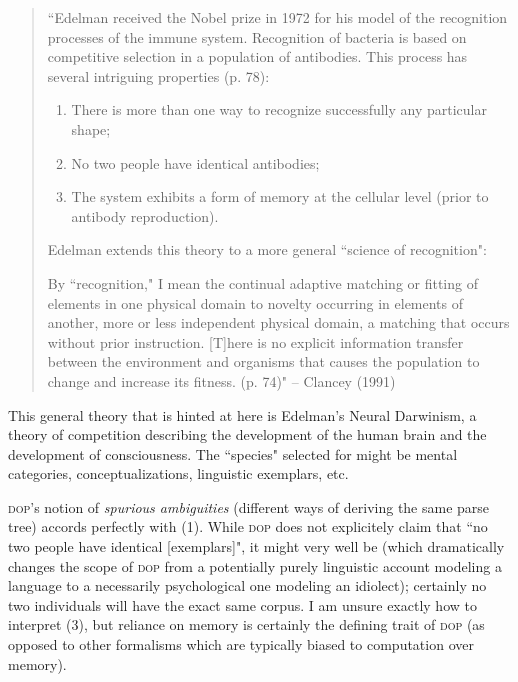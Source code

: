 \documentclass[10pt,a4paper]{article}
\begin{document}
\begin{quote}
	``Edelman received the Nobel prize in 1972 for his model of the
	recognition processes of the immune system. Recognition of bacteria is
	based on competitive selection in a population of antibodies. This
	process has several intriguing properties (p. 78): 
	
	\renewcommand{\theenumi}{(\arabic{enumi})}
	\renewcommand{\labelenumi}{\theenumi}

	\begin{enumerate} %

	\item There is more than one way to recognize successfully any particular shape;

	\item No two people have identical antibodies;

	\item The system exhibits a form of memory at the cellular level (prior to
	antibody reproduction).

	\end{enumerate}

	Edelman extends this theory to a more general ``science of recognition": 

	By ``recognition," I mean the continual adaptive matching or fitting of
	elements in one physical domain to novelty occurring in elements of
	another, more or less independent physical domain, a matching that
	occurs without prior instruction. [T]here is no explicit information
	transfer between the environment and organisms that causes the
	population to change and increase its fitness. (p. 74)" 
	-- Clancey (1991)
\end{quote}

This general theory that is hinted at here is Edelman's Neural Darwinism,
a theory of competition describing the development of the human brain and
the development of consciousness. The ``species" selected for might be mental
categories, conceptualizations, linguistic exemplars, etc. 

\textsc{dop}'s notion of {\em spurious ambiguities} (different ways of deriving the same
parse tree) accords perfectly with (1).  While \textsc{dop} does not explicitely claim
that ``no two people have identical [exemplars]", it might very well be (which
dramatically changes the scope of \textsc{dop} from a potentially purely linguistic
account modeling a language to a necessarily psychological one modeling an
idiolect); certainly no two individuals will have the exact same corpus. I am
unsure exactly how to interpret (3), but reliance on memory is certainly the
defining trait of \textsc{dop} (as opposed to other formalisms which are typically
biased to computation over memory).
\end{document}
